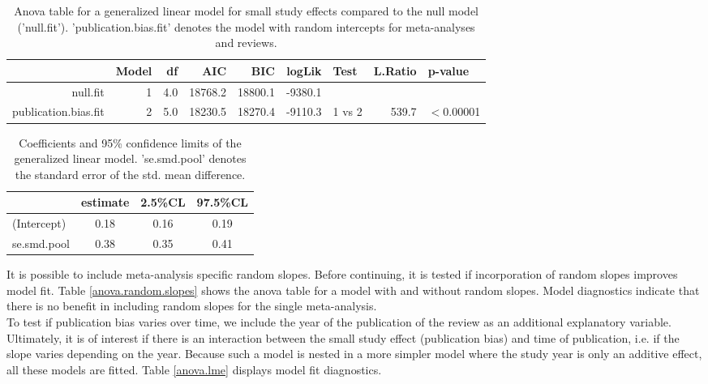 \documentclass[11pt,a4paper,twoside]{book}\usepackage[]{graphicx}\usepackage[]{color}
\begin{document}
\begin{table}[ht]
\centering
\begingroup\scriptsize
\begin{tabular}{rrrrrrlrl}
  \hline
 & Model & df & AIC & BIC & logLik & Test & L.Ratio & p-value \\ 
  \hline
null.fit &  1 & 4.0 & 18768.2 & 18800.1 & -9380.1 &  &  &  \\ 
  publication.bias.fit &  2 & 5.0 & 18230.5 & 18270.4 & -9110.3 & 1 vs 2 & 539.7 & $<$0.00001 \\ 
   \hline
\end{tabular}
\endgroup
\caption{Anova table for a generalized linear model for small study effects compared to the null model ('null.fit'). 'publication.bias.fit' denotes the model with random intercepts for meta-analyses and reviews.} 
\label{anova.small.study}
\end{table}


\begin{table}[ht]
\centering
\begingroup\scriptsize
\begin{tabular}{lccc}
  \hline
 & estimate & 2.5\%CL & 97.5\%CL \\ 
  \hline
(Intercept) & 0.18 & 0.16 & 0.19 \\ 
  se.smd.pool & 0.38 & 0.35 & 0.41 \\ 
   \hline
\end{tabular}
\endgroup
\caption{Coefficients and 95\% confidence limits of the generalized linear model. 'se.smd.pool' denotes the standard error of the std. mean difference.} 
\label{coefficients.small.study}
\end{table}


It is possible to include meta-analysis specific random slopes. Before continuing, it is tested if incorporation of random slopes improves model fit. Table \ref{anova.random.slopes} shows the anova table for a model with and without random slopes. Model diagnostics indicate that there is no benefit in including random slopes for the single meta-analysis. \\
To test if publication bias varies over time, we include the year of the publication of the review as an additional explanatory variable. Ultimately, it is of interest if there is an interaction between the small study effect (publication bias) and time of publication, i.e. if the slope varies depending on the year. Because such a model is nested in a more simpler model where the study year is only an additive effect, all these models are fitted. Table \ref{anova.lme} displays model fit diagnostics.
\end{document}
